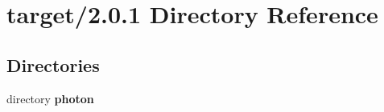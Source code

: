 \section{target/2.0.1 Directory Reference}
\label{dir_d6013682a1694c2f1c838e671abd9cb8}
\subsection*{Directories}
\begin{DoxyCompactItemize}
\item 
directory \textbf{ photon}
\end{DoxyCompactItemize}
